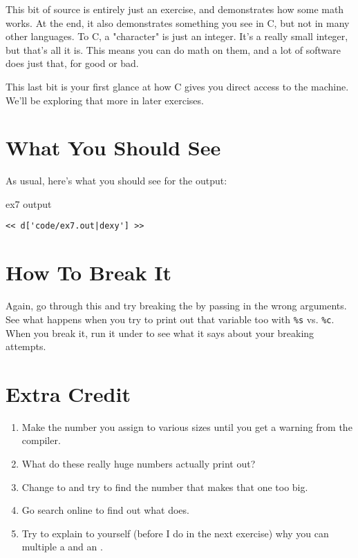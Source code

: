 This bit of source is entirely just an exercise, and demonstrates how
some math works.  At the end, it also demonstrates something you
see in C, but not in many other languages.  To C, a "character" is just an
integer.  It's a really small integer, but that's all it is.  This means
you can do math on them, and a lot of software does just that, for good
or bad.

This last bit is your first glance at how C gives you direct access to 
the machine.  We'll be exploring that more in later exercises.


\section{What You Should See}

As usual, here's what you should see for the output:

\begin{code}{ex7 output}
\begin{lstlisting}
<< d['code/ex7.out|dexy'] >>
\end{lstlisting}
\end{code}


\section{How To Break It}

Again, go through this and try breaking the  by passing in
the wrong arguments.  See what happens when you try to print out that
 variable too with \verb|%s| vs. \verb|%c|.  When you
break it, run it under  to see what it says about your
breaking attempts.

\section{Extra Credit}

\begin{enumerate}
\item Make the number you assign to  various 
    sizes until you get a warning from the compiler.
\item What do these really huge numbers actually print out?
\item Change  to  and try to find 
    the number that makes that one too big.
\item Go search online to find out what  does.
\item Try to explain to yourself (before I do in the next exercise)
    why you can multiple a  and an .
\end{enumerate}

